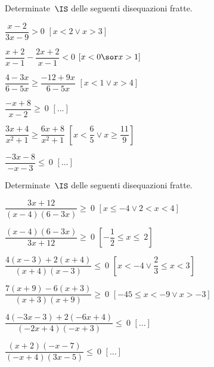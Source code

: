 \begin{esercizio}[]
\label{ese:21.55}
Determinate~\(\IS\) delle seguenti disequazioni fratte.
\begin{multicols}{2}
\begin{enumeratea}
\spazielenx
\item \(\dfrac{x-2}{3x-9}>0\) \hfill \(\left[x<2\vee x>3\right]\)
\item \(\dfrac{x+2}{x-1}-\dfrac{2x+2}{x-1} < 0\) 
\hfill \(\left[x< 0 \sor x>1\right]\)
\item \(\dfrac{4-3x}{6-5x}\geqslant \dfrac{-12+9x}{6-5x}\) 
\hfill \(\left[x<1\vee x>4\right]\)
\item \(\dfrac{-x+8}{x-2}\ge~0\) \hfill \(\left[...\right]\)
\item \(\dfrac{3x+4}{x^{2}+1}\ge\dfrac{6x+8}{x^{2}+1}\) 
 \hfill \(\left[x<\dfrac{6}{5}\vee x\ge\dfrac{11}{9}\right]\)
\item \(\dfrac{-3x-8}{-x-3}\le~0\) \hfill \(\left[...\right]\)
\end{enumeratea}
\end{multicols}
\end{esercizio}

\begin{esercizio}[]
\label{ese:21.55}
Determinate~\(\IS\) delle seguenti disequazioni fratte.
\begin{enumeratea}
\spazielenx
\item \(\dfrac{3x+12}{(x-4)(6-3x)}\geqslant~0\)
 \hfill \(\left[x\le -4 \vee 2<x<4\right]\)
\item \(\dfrac{(x-4)(6-3x)}{3x+12}\geqslant~0\)
 \hfill \(\left[-{\dfrac{1}{2}}\le x\le~2\right]\)
\item \(\dfrac{4(x-3)+2(x+4)}{(x+4)(x-3)}\leqslant~0\)
 \hfill \(\left[x<-4\vee\dfrac{2}{3}\le x<3\right]\)
\item \(\dfrac{7(x+9)-6(x+3)}{(x+3)(x+9)}\geqslant~0\)
 \hfill \(\left[-45\le x<-9\vee x>-3\right]\)
\item \(\dfrac{4(-3x-3)+2(-6x+4)}{(-2x+4)(-x+3)}\leqslant~0\)
 \hfill \(\left[...\right]\)
\item \(\dfrac{(x+2)(-x-7)}{(-x+4)(3x-5)}\leqslant~0\)
 \hfill \(\left[...\right]\)
\end{enumeratea}
\end{esercizio}

